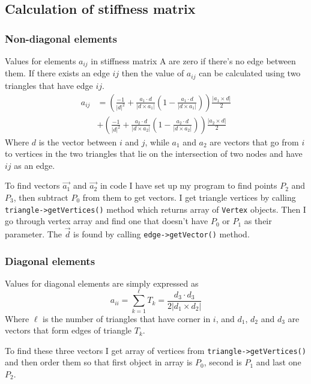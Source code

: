 \documentclass[a4,10pt]{article}
\begin{document}
\subsection{Calculation of stiffness matrix}
\subsubsection{Non-diagonal elements}
Values for elements $a_{ij}$ in stiffness matrix A are zero if there's no edge between them. If there exists an edge $ij$ then the value of $a_{ij}$ can be calculated using two triangles that have edge $ij$.
\begin{equation} 
\begin{aligned}\label{NonDiagAElement}
a_{ij} &= \left( \frac{-1}{|d|^2} + \frac{a_1 \cdot d}{|d \times a_1|} \left(1 - \frac{a_1 \cdot d}{|d \times a_1|}\right)\right)\frac{|a_1 \times d|}{2}\\ &+ \left( \frac{-1}{|d|^2} + \frac{a_2 \cdot d}{|d \times a_2|} \left(1 - \frac{a_2 \cdot d}{|d \times a_2|}\right)\right)\frac{|a_2 \times d|}{2}
\end{aligned} 
\end{equation}
Where $d$ is the vector between $i$ and $j$, while $a_1$ and $a_2$ are vectors that go from $i$ to vertices in the two triangles that lie on the intersection of two nodes and have $ij$ as an edge.

To find vectors $\overrightarrow{a_1}$ and $\overrightarrow{a_2}$ in code I have set up my program to find points $P_2$ and $P_3$, then subtract $P_0$ from them to get vectors. I get triangle vertices by calling \verb|triangle->getVertices()| method which returns array of \verb|Vertex| objects. Then I go through vertex array and find one that doesn't have $P_0$ or $P_1$ as their parameter. The $\overrightarrow{d}$ is found by calling \verb|edge->getVector()| method.

\subsubsection{Diagonal elements}
Values for diagonal elements are simply expressed as
\begin{equation} \label{DiagAElement}
a_{ii} = \sum_{k=1}^{\ell} T_k=\frac{d_3 \cdot d_3}{2 |d_1 \times d_2|}
\end{equation}
Where $\ell$ is the number of triangles that have corner in $i$, and $d_1$, $d_2$ and $d_3$ are vectors that form edges of triangle $T_k$.

To find these three vectors I get array of vertices from \verb|triangle->getVertices()| and then order them so that first object in array is $P_0$, second is $P_1$ and last one $P_2$.
\end{document}

